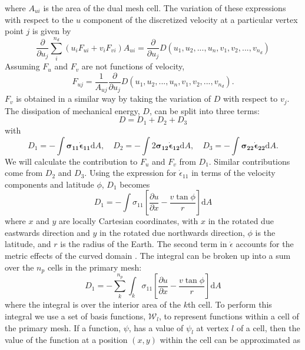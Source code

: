 where $A_{ui}$ is the area of the dual mesh cell.
The variation of these expressions with respect to the $u$ component of the discretized velocity at a particular vertex point $j$ is given by
\begin{equation}
\frac{\partial{}}{\partial{u_j}} \sum_i^{n_d} (u_i F_{ui} + v_i F_{vi}) A_{ui} =  \frac{\partial{}}{\partial{u_j}}D(u_1, u_2, ..., u_n, v_1, v_2, ..., v_{n_d})
\end{equation}
Assuming $F_u$ and $F_v$ are not functions of velocity,
\begin{equation}
F_{uj} =  \frac{1}{A_{uj}} \frac{\partial{}}{\partial{u_j}}D(u_1, u_2, ..., u_n, v_1, v_2, ..., v_{n_d}).
\label{eqn:variation}
\end{equation}
$F_v$ is obtained in a similar way by taking the variation of $D$ with respect to $v_j$. The dissipation of mechanical energy, $D$, can be split into three terms: 
\begin{equation}
D=D_1+ D_2+D_3
\end{equation}
with
\begin{equation}
D_1=-\int  \boldsymbol{\sigma_{11}} \boldsymbol{\dot{\epsilon}_{11}} \mathrm{d}A ,\quad D_2=-\int  2 \boldsymbol{\sigma_{12}} \boldsymbol{\dot{\epsilon}_{12}} \mathrm{d}A, \quad D_3=-\int  \boldsymbol{\sigma_{22}} \boldsymbol{\dot{\epsilon}_{22}} \mathrm{d}A.
\end{equation}
We will calculate the contribution to $F_u$ and $F_v$ from $D_1$. Similar contributions come from $D_2$ and $D_3$. Using the expression for $\dot{\epsilon}_{11}$ in terms of the velocity components and latitude $\phi$, $D_1$ becomes
\begin{equation}
D_1=-\int  \sigma_{11} \left[ \frac{\partial{u}}{\partial{x}} - \frac{v \tan{\phi}}{r} \right] \mathrm{d}A
\end{equation}
where $x$ and $y$ are locally Cartesian coordinates, with $x$ in the rotated due eastwards direction and $y$ in the rotated due northwards direction, $\phi$ is the latitude, and $r$ is the radius of the Earth. The second term in $\dot{\epsilon}$ accounts for the metric effects of the curved domain \citep{Batchelor67}.
The integral can be broken up into a sum over the $n_p$ cells in the primary mesh:
\begin{equation}
D_1=- \sum_k^{n_p} \int_k  \sigma_{11} \left[ \frac{\partial{u}}{\partial{x}} - \frac{v \tan{\phi}}{r} \right] \mathrm{d}A
\label{eqn:d_1}
\end{equation}
where the integral is over the interior area of the $k$th cell. 
To perform this integral we use a set of basis functions, $\mathcal{W}_l$, to represent functions within a cell of the primary mesh. If a function, $\psi$, has a value of  $\psi_l$ at vertex $l$ of a cell, then the value of the function at a position $(x,y)$ within the cell can be approximated as
